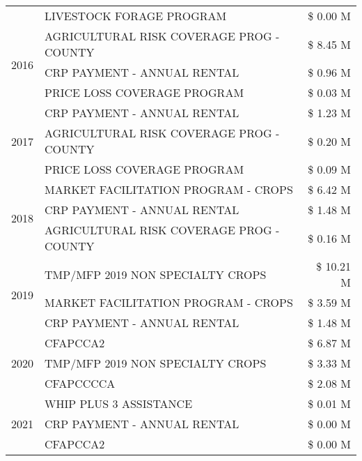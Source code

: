\begin{tabular}{llr}
 & LIVESTOCK FORAGE PROGRAM & \$ 0.00 M \\
\cline{1-3}
\multirow[t]{3}{*}{2016} & AGRICULTURAL RISK COVERAGE PROG - COUNTY      & \$ 8.45 M \\
 & CRP PAYMENT - ANNUAL RENTAL                   & \$ 0.96 M \\
 & PRICE LOSS COVERAGE PROGRAM                   & \$ 0.03 M \\
\cline{1-3}
\multirow[t]{3}{*}{2017} & CRP PAYMENT - ANNUAL RENTAL & \$ 1.23 M \\
 & AGRICULTURAL RISK COVERAGE PROG - COUNTY & \$ 0.20 M \\
 & PRICE LOSS COVERAGE PROGRAM & \$ 0.09 M \\
\cline{1-3}
\multirow[t]{3}{*}{2018} & MARKET FACILITATION PROGRAM - CROPS & \$ 6.42 M \\
 & CRP PAYMENT - ANNUAL RENTAL & \$ 1.48 M \\
 & AGRICULTURAL RISK COVERAGE PROG - COUNTY & \$ 0.16 M \\
\cline{1-3}
\multirow[t]{3}{*}{2019} & TMP/MFP 2019 NON SPECIALTY CROPS & \$ 10.21 M \\
 & MARKET FACILITATION PROGRAM - CROPS & \$ 3.59 M \\
 & CRP PAYMENT - ANNUAL RENTAL & \$ 1.48 M \\
\cline{1-3}
\multirow[t]{3}{*}{2020} & CFAPCCA2 & \$ 6.87 M \\
 & TMP/MFP 2019 NON SPECIALTY CROPS & \$ 3.33 M \\
 & CFAPCCCCA & \$ 2.08 M \\
\cline{1-3}
\multirow[t]{3}{*}{2021} & WHIP PLUS 3 ASSISTANCE & \$ 0.01 M \\
 & CRP PAYMENT - ANNUAL RENTAL & \$ 0.00 M \\
 & CFAPCCA2 & \$ 0.00 M \\
\cline{1-3}
\bottomrule
\end{tabular}
